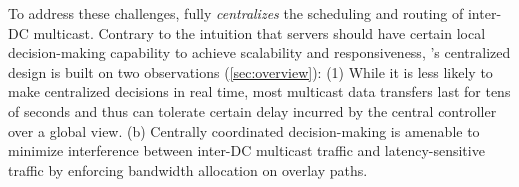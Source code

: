 %

To address these challenges, \name fully {\em centralizes}
the scheduling and routing of inter-DC multicast.
Contrary to the intuition that servers should have certain
local decision-making capability to achieve scalability and
responsiveness, \name's centralized design
is built on two observations (\Section\ref{sec:overview}):
(1) While it is less likely to make
centralized decisions in real time, most multicast data transfers
last for tens of seconds and thus can tolerate certain delay incurred by
the central controller over a global view.
(b) Centrally coordinated decision-making is amenable
to minimize interference between inter-DC multicast
traffic and latency-sensitive traffic by enforcing
bandwidth allocation on overlay paths.

